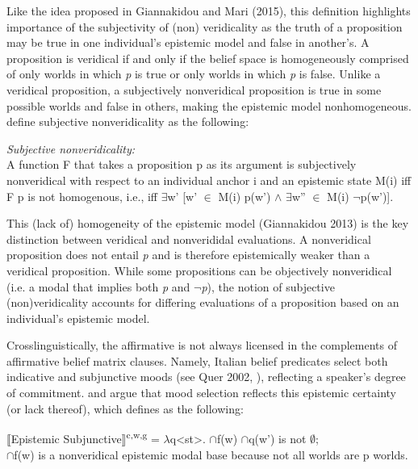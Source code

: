 \documentclass[output=paper,colorlinks,citecolor=brown,
]{langscibook}
\begin{document}
Like the idea proposed in Giannakidou and Mari (2015), this definition highlights importance of the subjectivity of (non) veridicality as the truth of a proposition may be true in one individual's epistemic model and false in another's. A proposition is veridical if and only if the belief space is homogeneously comprised of only worlds in which \textit{p} is true or only worlds in which \textit{p} is false. Unlike a veridical proposition, a subjectively nonveridical proposition is true in some possible worlds and false in others, making the epistemic model nonhomogeneous. \citet[61]{GiannakidouMari2020} define subjective nonveridicality as the following:

\begin{exe}
    \ex\label{ex:bove:11}
   \textit{Subjective nonveridicality:}\\
     A function F that takes a proposition p as its argument is subjectively nonveridical with respect to an individual anchor i and an epistemic state 
M(i) iff F p is not homogenous, i.e., iff ${\exists}$w' [w' ${\in}$ M(i) p(w') $\wedge$ ${\exists}$w'' ${\in}$ M(i) $\neg$p(w')].
 \end{exe}
  

This (lack of) homogeneity of the epistemic model (Giannakidou 2013) is the key distinction between veridical and nonverididal evaluations. A nonveridical proposition does not entail \textit{p }and is therefore epistemically weaker than a veridical proposition. While some propositions can be objectively nonveridical (i.e. a modal that implies both \textit{p }and $\neg$\textit{p}), the notion of subjective (non)veridicality accounts for differing evaluations of a proposition based on an individual's epistemic model.



Crosslinguistically, the affirmative is not always licensed in the complements of affirmative belief matrix clauses. Namely, Italian belief predicates select both indicative and subjunctive moods (see Quer 2002, \citealt{Portner1997,Mari2016}), reflecting a speaker's degree of commitment. \citet{Giannakidou2015} and \citet{Mari2016} argue that mood selection reflects this epistemic certainty (or lack thereof), which \citet[12]{Giannakidou2015} defines as the following:

\begin{exe}
\ex\label{ex:bove:12}
 ⟦Epistemic Subjunctive⟧\textsuperscript{c,w,g} = $\lambda$q{\textless}st{\textgreater}. ${\cap}$f(w) ${\cap}$q(w') is not ${\emptyset}$;\\
 ${\cap}$f(w) is a nonveridical epistemic modal base because not all worlds are p worlds.
\end{exe}
\end{document}
